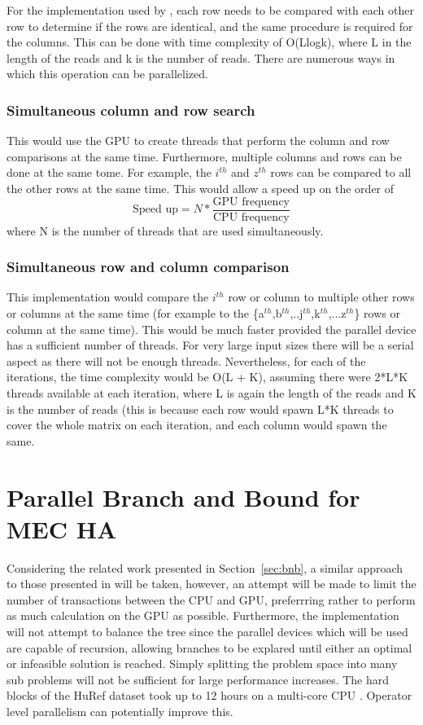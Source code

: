 \documentclass[10pt,a4paer,twocolumn]{article}
\begin{document}
For the implementation used by \cite{chen:2013}, each row needs to be compared with each other row to
determine if the rows are identical, and the same procedure is required for the columns. This can be done with
time complexity of O(Llogk), where L in the length of the reads and k is the number of reads. There are
numerous ways in which this operation can be parallelized.

\subsubsection{Simultaneous column and row search} This would use the GPU to create threads that perform the
column and row comparisons at the same time. Furthermore, multiple columns and rows can be done at the same
tome. For example, the $i^{th}$ and $z^{th}$ rows can be compared to all the other rows at the same time. This
would allow a speed up on the order of
\begin{equation}
    \textrm{Speed up} = N * \frac{\textrm{GPU frequency}}{\textrm{CPU frequency}}
\end{equation}
where N is the number of threads that are used simultaneously.

\subsubsection{Simultaneous row and column comparison} This implementation would compare the $i^{th}$ row or
column to multiple other rows or columns at the same time (for example to the
\{a$^{th}$,b$^{th}$,..j$^{th}$,k$^{th}$,...z$^{th}$\} rows or column at the same time). This would be much
faster provided the parallel device has a sufficient number of threads. For very large input sizes there will
be a serial aspect as there will not be enough threads. Nevertheless, for each of the iterations, the time
complexity would be O(L + K), assuming there were 2*L*K threads available at each iteration, where L is again
the length of the reads and K is the number of reads (this is because each row would spawn L*K threads to
cover the whole matrix on each iteration, and each column would spawn the same.

\section{ Parallel Branch and Bound for MEC HA } \label{sec:parbnb}

Considering the related work presented in Section~\ref{sec:bnb}, a similar approach to those presented in
\cite{melab:2012, chakroun:2012, chakroun:2013} will be taken, however, an attempt will be made to limit the
number of transactions between the CPU and GPU, preferrring rather to perform as much calculation on the GPU
as possible. Furthermore, the implementation will not attempt to balance the tree since the parallel devices
which will be used are capable of recursion, allowing branches to be explared until either an optimal or
infeasible solution is reached. Simply splitting the problem space into many sub problems will not be
sufficient for large performance increases. The hard blocks of the HuRef dataset took up to 12 hours on a
multi-core CPU \cite{chen:2013}. Operator level parallelism can potentially improve this.
\end{document}
